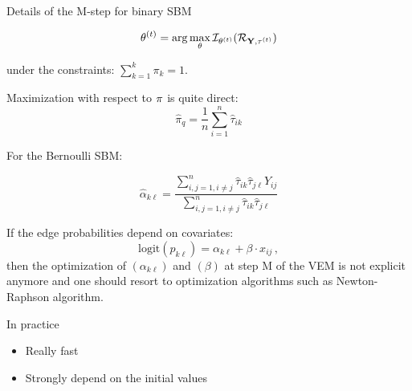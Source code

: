 \documentclass[compress,10pt]{beamer}
\begin{document}
 \begin{frame}[allowframebreaks]{Details of the M-step for binary SBM}

$$\theta^{(t)} = \arg \max_{\theta}   \mathcal{I}_{\theta^{(t)}}(\mathcal{R}_{\mathbf{Y}, \mathbf{\tau}^{(t)}}) $$

under the constraints: $ \sum_{k=1}^k \pi_k=1.$


Maximization with respect to $\mathbf{\pi}$ is quite direct:
$$
\widehat{\pi}_q = \frac{1}{n} \sum_{i=1}^n \widehat{\tau}_{ik}
$$ 
 
For the Bernoulli SBM: 

$$
\widehat{\alpha}_{k\ell} = \frac{\sum_{i,j=1,i\neq j}^n \widehat{\tau}_{ik}  \widehat{\tau}_{j\ell} Y_{ij}}{\sum_{i,j=1,i\neq j}^n  \widehat{\tau}_{ik}  \widehat{\tau}_{j\ell} }
$$

If the edge probabilities depend on covariates:
\begin{equation}
 \nonumber
 \mbox{logit}(p_{k\ell}) = \alpha_{k\ell} +  \beta \cdot x_{ij}\,,
\end{equation}
then the optimization of $ (\alpha_{k\ell})$ and $ (\beta)$ at step M of the VEM is not explicit anymore and one should resort  to optimization algorithms such as Newton-Raphson
algorithm.  
 
 \end{frame}
\begin{frame}{In practice}
\begin{itemize}
\item Really fast
\item Strongly depend on the initial values
\end{itemize}

\end{frame}
 
\end{document}
